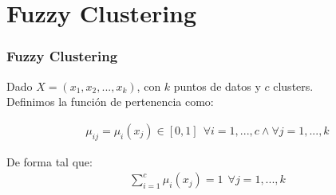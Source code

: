 \section{Fuzzy Clustering}

\begin{frame}
\frametitle{Fuzzy Clustering}

\pause

Dado $X = (x_1, x_2,..., x_k)$, con $k$ puntos de datos y $c$ clusters. \\

\pause
Definimos la función de pertenencia como:

\begin{equation}
    \begin{aligned}
        \mu_{ij} = \mu_i(x_j) \in [0, 1] \ \ \forall i = 1,...,c \land \forall j = 1,...,k
    \end{aligned}
\end{equation} 

\pause

De forma tal que:
%
\begin{equation}
    \begin{aligned}
        \sum_{i=1}^{c} \mu_i(x_j) = 1 \ \ \forall j = 1,...,k
    \end{aligned}
\end{equation} 


\end{frame}

